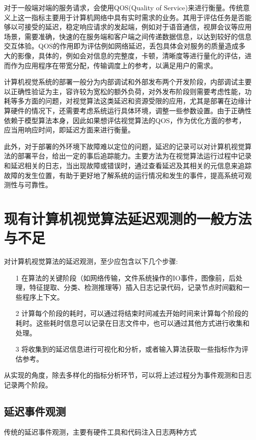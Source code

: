 \documentclass[master]{shtthesis}
\begin{document}
对于一般端对端的服务请求，会使用QOS(Quality of Service)来进行衡量。传统意义上这一指标主要用于计算机网络中具有实时需求的业务。其用于评估任务是否能够以可接受的延迟，稳定响应请求的发起端，例如对于语音通信，视屏会议等应用场景，需要准确，快速的在服务端和客户端之间传递数据信息，以达到较好的信息交互体验。QOS的作用即为评估例如网络延迟，丢包具体会对服务的质量造成多大的影像，具体的，例如会对信息的完整度，卡顿，清晰度等进行量化的评估，进而作为应用程序在带宽分配，传输调度上的参考，以满足用户的需求。

计算机视觉系统的部署一般分为内部调试和外部发布两个开发阶段，内部调试主要以正确性验证为主，容许较为宽松的额外负荷，对外发布阶段则需要考虑性能，功耗等多方面的问题，对视觉算法这类延迟和资源受限的应用，尤其是部署在边缘计算硬件的情况下，还需要考虑系统运行具体环境，调整一些参数设置。由于正确性依赖于模型算法本身，因此如果想评估视觉算法的QOS，作为优化方面的参考，应当用响应时间，即延迟方面来进行衡量。

此外，对于部署的外环境下故障难以定位的问题，延迟的记录可以对计算机视觉算法的部署平台，给出一定的事后追踪能力。主要方法为在视觉算法运行过程中记录和延迟相关的日志，当出现故障或错误时，通过查看延迟及其相关的元信息来追踪故障的发生位置，有助于更好地了解系统的运行情况和发生的事件，提高系统可观测性与可靠性。

\section{现有计算机视觉算法延迟观测的一般方法与不足}\label{现有计算机视觉算法延迟观测的一般方法与不足}
对计算机视觉算法的延迟观测，至少应包含以下几个步骤:
\begin{itemize}
	\item[1]在算法的关键阶段（如网络传输，文件系统操作的IO事件，图像前，后处理，特征提取、分类、检测推理等）插入日志记录代码，记录节点时间戳和一些程序上下文。
	\item[2]计算每个阶段的耗时，可以通过将结束时间减去开始时间来计算每个阶段的耗时。这些耗时信息可以记录在日志文件中，也可以通过其他方式进行收集和处理。
	\item[3] 将收集到的延迟信息进行可视化和分析，或者输入算法获取一些指标作为评估参考。
\end{itemize}
从实现的角度，除去多样化的指标分析环节，可以将上述过程分为事件观测和日志记录两个阶段。

\subsection{延迟事件观测}\label{延迟事件观测}
传统的延迟事件观测，主要有硬件工具和代码注入日志两种方式
\end{document}
